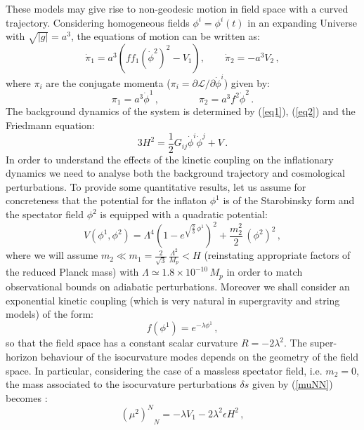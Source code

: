 \documentclass[a4paper,11pt]{article}
\def\be{\begin{equation}}
\def\ee{\end{equation}}
\begin{document}
These models may give rise to non-geodesic motion in field space with a curved trajectory. Considering homogeneous fields $\phi^i=\phi^i(t)$ in an expanding Universe with $\sqrt{|g|}=a^3$, the equations of motion can be written as:
\be
\dot\pi_1 = a^3 \left(f f_1(\dot\phi^2)^2 -V_1\right), \qquad 
\dot\pi_2 =-a^3 V_2\,,
\label{eq1}
\ee
where $\pi_i$ are the conjugate momenta ($\pi_i=\partial \mathcal{L}/\partial \dot{\phi}^i$) given by:
\be
\pi_1 = a^3 \dot\phi^1\,, \qquad\qquad \pi_2 = a^3 f^2 \dot\phi^2\,.
\label{eq2}
\ee
The background dynamics of the system is determined by (\ref{eq1}), (\ref{eq2}) and the Friedmann equation:
\be
3 H^2= \frac12 G_{ij}\dot{\phi}^i\dot{\phi}^j+V \,.
\ee
In order to understand the effects of the kinetic coupling on the inflationary dynamics we need to analyse both the background trajectory and cosmological perturbations. To provide some quantitative results, let us assume for concreteness that the potential for the inflaton $\phi^1$ is of the Starobinsky form \cite{Starobinsky:1980te} and the spectator field $\phi^2$ is equipped with a quadratic potential:
\be 
V(\phi^1,\phi^2)=\Lambda^4 \left(1-e^{\sqrt{\frac23}\,\phi^1}\right)^2 +\frac{m_2^2}{2}\,(\phi^2)^2\,,
\label{eq:example}
\ee
where we will assume $m_2\ll m_1 = \frac{2}{\sqrt{3}}\,\frac{\Lambda^2}{M_p} < H$ (reinstating appropriate factors of the reduced Planck mass) with $\Lambda\simeq 1.8\times 10^{-10}\,M_p$ in order to match observational bounds on adiabatic perturbations. Moreover we shall consider an exponential kinetic coupling (which is very natural in supergravity and string models) of the form:
\be 
f(\phi^1)=e^{-\lambda \phi^1}\,,
\label{eq:kc_example}
\ee
so that the field space has a constant scalar curvature $R=-2\lambda^2$. The super-horizon behaviour of the isocurvature modes depends on the geometry of the field space. In particular, considering the case of a massless spectator field, i.e. $m_2=0$, the mass associated to the isocurvature perturbations $\delta s$ given by (\ref{muNN}) becomes \cite{Cicoli:2019ulk}: 
\be 
{\left(\mu^2\right )^N}_N=-\lambda V_1 -2 \lambda^2 \epsilon H^2 \,,
\ee
\end{document}
